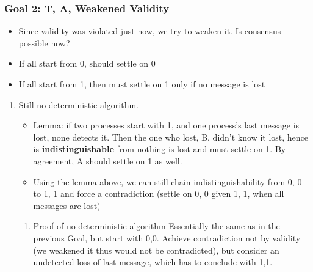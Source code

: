 \documentclass[11pt]{article}
\begin{document}
\subsubsection{Goal 2: T, A, Weakened Validity}
\label{sec:orgf15b4ba}
\begin{itemize}
  \item Since validity was violated just now, we try to weaken it. Is consensus
        possible now?
  \item If all start from 0, should settle on 0
  \item If all start from 1, then must settle on 1 only if no message is lost
\end{itemize}
\begin{enumerate}
  \item Still no deterministic algorithm.
        \label{sec:orgc435ea8}
        \begin{itemize}
          \item Lemma: if two processes start with 1, and one process's last message is lost,
                none detects it. Then the one who lost, B, didn't know it lost, hence is
                \textbf{indistinguishable} from nothing is lost and must settle on 1. By agreement, A
                should settle on 1 as well.
          \item Using the lemma above, we can still chain indistinguishability from 0, 0 to 1,
                1 and force a contradiction (settle on 0, 0 given 1, 1, when all messages are
                lost)
        \end{itemize}
        \begin{enumerate}
          \item Proof of no deterministic algorithm
                \label{sec:org4fc6e07}
                Essentially the same as in the previous Goal, but start with 0,0. Achieve
                contradiction not by validity (we weakened it thus would not be contradicted),
                but consider an undetected loss of last message, which has to conclude with 1,1.
        \end{enumerate}
\end{enumerate}
\end{document}
